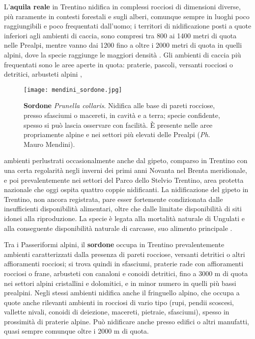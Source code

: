 \documentclass[10pt,twoside,openany,x11names,svgnames,italian,a5paper,dvipsnames,table]{memoir}
\newcommand{\ph}{\emph{Ph}. }
\begin{document}
L'\textbf{aquila reale} in Trentino nidifica in complessi rocciosi di dimensioni diverse, più raramente in contesti forestali e sugli alberi, comunque sempre in luoghi poco raggiungibili e poco frequentati dall’uomo; i territori di nidificazione posti a quote inferiori agli ambienti di caccia, sono compresi tra 800 ai 1400 metri di quota nelle Prealpi, mentre vanno dai 1200 fino a oltre i 2000 metri di quota in quelli alpini, dove la specie raggiunge le maggiori densità \cite{Pedrini02} \cite{Pedrini05}. Gli ambienti di caccia più frequentati sono le aree aperte in quota: praterie, pascoli, versanti rocciosi o detritici, arbusteti alpini ,\begin{wrapfigure}[19]{r}{.6\columnwidth}
\centering
  \texttt{[image: mendini\_sordone.jpg]}
  \caption*{\textbf{Sordone} \emph{Prunella collaris}. Nidifica alle base di pareti rocciose, presso sfasciumi o macereti, in cavità e a terra; specie confidente, spesso si può lascia osservare con facilità. È presente nelle aree propriamente alpine e nei settori più elevati delle Prealpi (\ph Mauro Mendini).}
\end{wrapfigure} ambienti perlustrati occasionalmente anche dal gipeto, comparso in Trentino con una certa regolarità negli inverni dei primi anni Novanta nel Brenta meridionale, e poi prevalentemente nei settori del Parco dello Stelvio Trentino, area protetta nazionale che oggi ospita quattro coppie nidificanti. La nidificazione del gipeto in Trentino, non ancora registrata, pare esser fortemente condizionata dalle insufficienti disponibilità alimentari, oltre che dalle limitate disponibilità di siti idonei alla riproduzione. La specie è legata alla mortalità naturale di Ungulati e alla conseguente disponibilità naturale di carcasse, suo alimento principale \cite{Genero96}.

Tra i Passeriformi alpini, il \textbf{sordone} occupa in Trentino prevalentemente ambienti caratterizzati dalla presenza di pareti rocciose, versanti detritici o altri affioramenti rocciosi; si trova quindi in sfasciumi, praterie rade con affioramenti rocciosi o frane, arbusteti con canaloni e conoidi detritici, fino a 3000 m di quota nei settori alpini cristallini e dolomitici, e in minor numero in quelli più bassi prealpini. Negli stessi ambienti nidifica anche il fringuello alpino, che occupa a quote anche rilevanti ambienti in rocciosi di vario tipo (rupi, pendii scoscesi, vallette nivali, conoidi di deiezione, macereti, pietraie, sfasciumi), spesso in prossimità di praterie alpine. Può nidificare anche presso edifici o altri manufatti, quasi sempre comunque oltre i 2000 m di quota.
\end{document}
